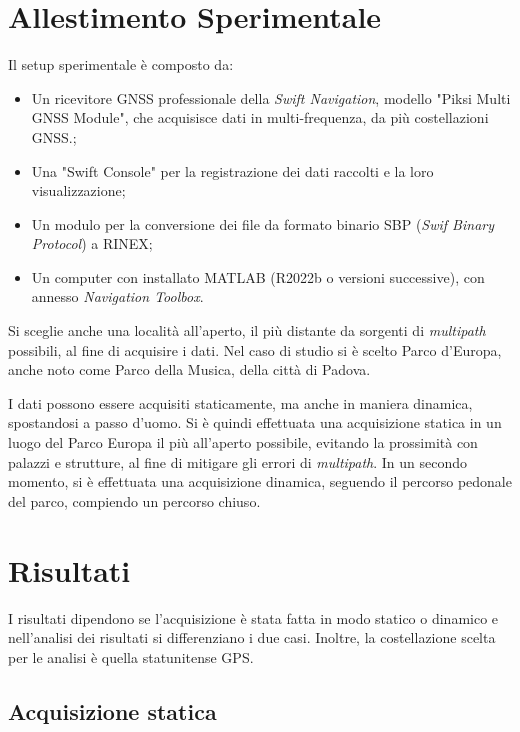 \documentclass[a4paper,11pt,twoside]{book}
\begin{document}
	\section{Allestimento Sperimentale}
	
	Il setup sperimentale è composto da:
	
	\begin{itemize}[-]
		\item Un ricevitore GNSS professionale della \textit{Swift Navigation}, modello "Piksi Multi GNSS Module", che acquisisce dati in multi-frequenza, da più costellazioni GNSS.;
		
		\item Una "Swift Console" per la registrazione dei dati raccolti e la loro visualizzazione;
		
		\item Un modulo per la conversione dei file da formato binario SBP (\textit{Swif Binary Protocol}) a RINEX;
		
		\item Un computer con installato MATLAB (R2022b o versioni successive), con annesso \textit{Navigation Toolbox}.
		
	\end{itemize}
	
	Si sceglie anche una località all'aperto, il più distante da sorgenti di \textit{multipath} possibili, al fine di acquisire i dati. Nel caso di studio si è scelto Parco d'Europa, anche noto come Parco della Musica, della città di Padova.
	
	I dati possono essere acquisiti staticamente, ma anche in maniera dinamica, spostandosi a passo d'uomo. Si è quindi effettuata una acquisizione statica in un luogo del Parco Europa il più all'aperto possibile, evitando la prossimità con palazzi e strutture, al fine di mitigare gli errori di \textit{multipath}. In un secondo momento, si è effettuata una acquisizione dinamica, seguendo il percorso pedonale del parco, compiendo un percorso chiuso.
	
	\section{Risultati}
	
	I risultati dipendono se l'acquisizione è stata fatta in modo statico o dinamico e nell'analisi dei risultati si differenziano i due casi. Inoltre, la costellazione scelta per le analisi è quella statunitense GPS.
	
	\subsection{Acquisizione statica}
	
\end{document}
